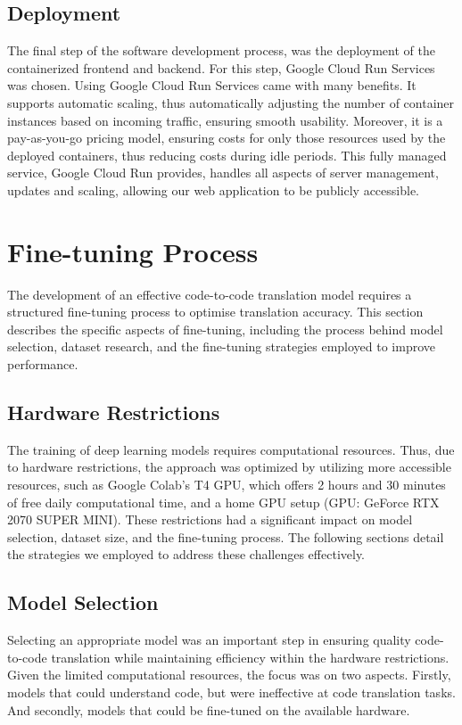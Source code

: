 \documentclass[conference]{IEEEtran}
\begin{document}
\subsection{Deployment}
The final step of the software development process, was the deployment of the containerized frontend and backend. 
For this step, Google Cloud Run Services was chosen. 
Using Google Cloud Run Services came with many benefits.
It supports automatic scaling, thus automatically adjusting the number of container instances based on incoming traffic, ensuring smooth usability. Moreover, it is a pay-as-you-go pricing model, ensuring costs for only those resources used by the deployed containers, thus reducing costs during idle periods. 
This fully managed service, Google Cloud Run provides, handles all aspects of server management, updates and scaling, allowing our web application to be publicly accessible.

\section{Fine-tuning Process}\label{train}
The development of an effective code-to-code translation model requires a structured fine-tuning process to optimise translation accuracy. This section describes the specific aspects of fine-tuning, including the process behind model selection, dataset research, and the fine-tuning strategies employed to improve performance.

\subsection{Hardware Restrictions}
The training of deep learning models requires computational resources. Thus, due to hardware restrictions, the approach was optimized by utilizing more accessible resources, such as Google Colab's T4 GPU, which offers 2 hours and 30 minutes of free daily computational time, and a home GPU setup (GPU: GeForce RTX 2070 SUPER MINI).
These restrictions had a significant impact on model selection, dataset size, and the fine-tuning process. The following sections detail the strategies we employed to address these challenges effectively.

\subsection{Model Selection}\label{train-model}
Selecting an appropriate model was an important step in ensuring quality code-to-code translation while maintaining efficiency within the hardware restrictions. Given the limited computational resources, the focus was on two aspects. Firstly, models that could understand code, but were ineffective at code translation tasks. And secondly, models that could be fine-tuned on the available hardware.
\end{document}
